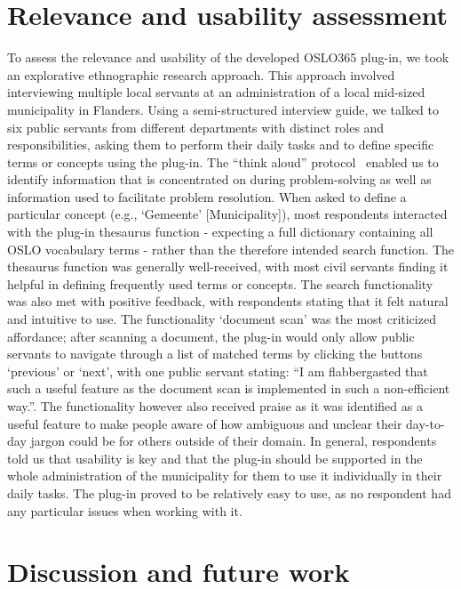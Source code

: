 \documentclass[manuscript]{acmart}
\begin{document}
\section{Relevance and usability assessment}

To assess the relevance and usability of the developed OSLO365 plug-in, we took an explorative ethnographic research approach. 
This approach involved interviewing multiple local servants at an administration of a local mid-sized municipality in Flanders. 
Using a semi-structured interview guide, we talked to six public servants from different departments with distinct roles and responsibilities, asking them to perform their daily tasks and to define specific terms or concepts using the plug-in. 
The ``think aloud'' protocol~\cite{jaaskelainen2010think} enabled us to identify information that is concentrated on during problem-solving as well as information used to facilitate problem resolution. 
When asked to define a particular concept (e.g., `Gemeente' [Municipality]), most respondents interacted with the plug-in thesaurus function - expecting a full dictionary containing all OSLO vocabulary terms - rather than the therefore intended search function. 
The thesaurus function was generally well-received, with most civil servants finding it helpful in defining frequently used terms or concepts. 
The search functionality was also met with positive feedback, with respondents stating that it felt natural and intuitive to use.  
The functionality `document scan' was the most criticized affordance; after scanning a document, the plug-in would only allow public servants to navigate through a list of matched terms by clicking the buttons `previous' or `next', with one public servant stating: ``I am flabbergasted that such a useful feature as the document scan is implemented in such a non-efficient way.''. 
The functionality however also received praise as it was identified as a useful feature to make people aware of how ambiguous and unclear their day-to-day jargon could be for others outside of their domain.  
In general, respondents told us that usability is key and that the plug-in should be supported in the whole administration of the municipality for them to use it individually in their daily tasks. 
The plug-in proved to be relatively easy to use, as no respondent had any particular issues when working with it. 

\section{Discussion and future work}
\end{document}
